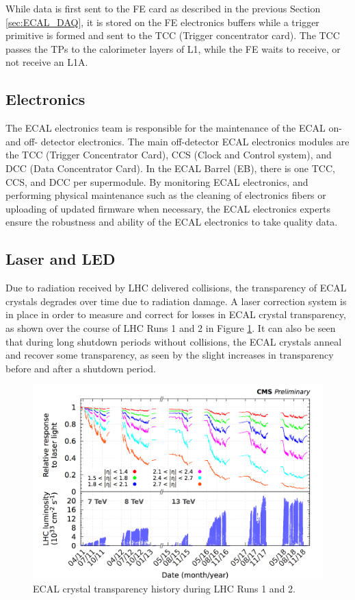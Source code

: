 While data is first sent to the FE card as described in the previous Section \ref{sec:ECAL_DAQ}, it is stored on the FE electronics buffers while a trigger primitive is formed and sent to the TCC (Trigger concentrator card). The TCC passes the TPs to the calorimeter layers of L1, while the FE waits to receive, or not receive an L1A. 

\subsection{Electronics}

The ECAL electronics team is responsible for the maintenance of the ECAL on- and off- detector electronics. The main off-detector ECAL electronics modules are the TCC (Trigger Concentrator Card), CCS (Clock and Control system), and DCC (Data Concentrator Card). In the ECAL Barrel (EB), there is one TCC, CCS, and DCC per supermodule. By monitoring ECAL electronics, and performing physical maintenance such as the cleaning of electronics fibers or uploading of updated firmware when necessary, the ECAL electronics experts ensure the robustness and ability of the ECAL electronics to take quality data. 


\subsection{Laser and LED}

Due to radiation received by LHC delivered collisions, the transparency of ECAL crystals degrades over time due to radiation damage. A laser correction system is in place in order to measure and correct for losses in ECAL crystal transparency, as shown over the course of LHC Runs 1 and 2 in Figure \ref{fig:ECAL_Laser_History}. It can also be seen that during long shutdown periods without collisions, the ECAL crystals anneal and recover some transparency, as seen by the slight increases in transparency before and after a shutdown period.

\begin{figure}[H]
    \centering
    \includegraphics[width=\textwidth]{Images/ECAL_Operations/ECAL_Laser_History.png}
    \caption{ECAL crystal transparency history during LHC Runs 1 and 2.}
    \label{fig:ECAL_Laser_History}
\end{figure}

